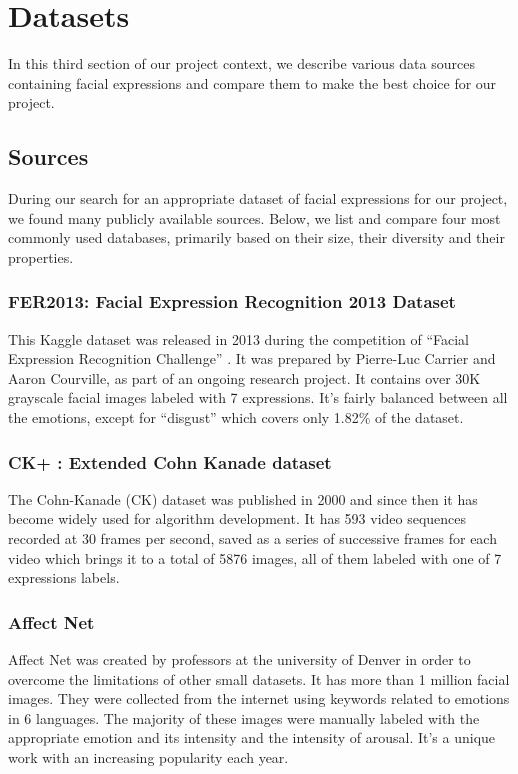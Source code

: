 \documentclass[12pt,a4paper,oneside,english]{book}
\begin{document}
\section{Datasets}
In this third section of our project context, we describe various data sources containing facial expressions and compare them to make the best choice for our project.

\subsection{Sources}
During our search for an appropriate dataset of facial expressions for our project, we found many publicly available sources. Below, we list and compare four most commonly used databases, primarily based on their size, their diversity and their properties.

\subsubsection{FER2013: Facial Expression Recognition 2013 Dataset } 
This Kaggle dataset was released in 2013 during the competition of “Facial Expression Recognition Challenge” \cite{ferData}. It was prepared by Pierre-Luc Carrier and Aaron Courville, as part of an ongoing research project. It contains over 30K grayscale facial images labeled with 7 expressions. It’s fairly balanced between all the emotions, except for “disgust” which covers only 1.82\% of the dataset.

\subsubsection{CK+ : Extended Cohn Kanade dataset }
The Cohn-Kanade (CK) dataset\cite{ckData} was published in 2000 and since then it has become widely used for algorithm development. It has 593 video sequences recorded at 30 frames per second, saved as a series of successive frames for each video which brings it to a total of 5876 images, all of them labeled with one of 7 expressions labels.

\subsubsection{Affect Net}
Affect Net\cite{affectNetData} was created by professors at the university of Denver in order to overcome the limitations of other small datasets. It has more than 1 million facial images. They were collected from the internet using keywords related to emotions in 6 languages. The majority of these images were manually labeled with the appropriate emotion and its intensity and the intensity of arousal. It’s a unique work with an increasing popularity each year.
\end{document}
